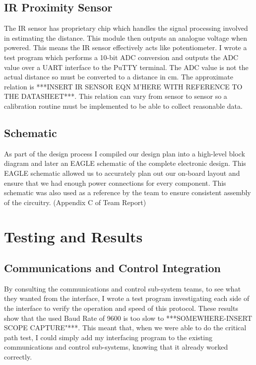 \documentclass[a4paper,11pt]{article}
\begin{document}
\subsection{IR Proximity Sensor}
The IR sensor has proprietary chip which handles the signal processing involved in estimating the distance. This module then outputs an analogue voltage when powered. This means the IR sensor effectively acts like potentiometer. I wrote a test program which performs a 10-bit ADC conversion and outputs the ADC value over a UART interface to the PuTTY terminal. The ADC value is not the actual distance so must be converted to a distance in cm. The approximate relation is ***INSERT IR SENSOR EQN M'HERE WITH REFERENCE TO THE DATASHEET***. This relation can vary from sensor to sensor so a calibration routine must be implemented to be able to collect reasonable data.
\subsection{Schematic}
As part of the design process I compiled our design plan into a high-level block diagram and later an EAGLE schematic of the complete electronic design. This EAGLE schematic allowed us to accurately plan out our on-board layout and ensure that we had enough power connections for every component. This schematic was also used as a reference by the team to ensure consistent assembly of the circuitry. (Appendix C of Team Report)



\section{Testing and Results}
\subsection{Communications and Control Integration}
By consulting the communications and control sub-system teams, to see what they wanted from the interface, I wrote a test program investigating each side of the interface to verify the operation and speed of this protocol. These results show that the used Baud Rate of 9600 is too slow to ***SOMEWHERE-INSERT SCOPE CAPTURE"***. This meant that, when we were able to do the critical path test, I could simply add my interfacing program to the existing communications and control sub-systems, knowing that it already worked correctly.
\end{document}

